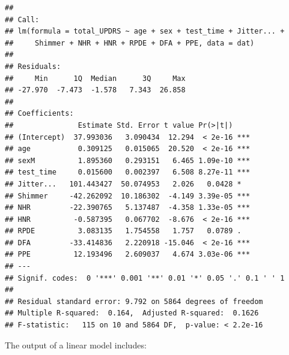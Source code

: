 \documentclass[
]{article}
\begin{document}
\begin{verbatim}
## 
## Call:
## lm(formula = total_UPDRS ~ age + sex + test_time + Jitter... + 
##     Shimmer + NHR + HNR + RPDE + DFA + PPE, data = dat)
## 
## Residuals:
##     Min      1Q  Median      3Q     Max 
## -27.970  -7.473  -1.578   7.343  26.858 
## 
## Coefficients:
##               Estimate Std. Error t value Pr(>|t|)    
## (Intercept)  37.993036   3.090434  12.294  < 2e-16 ***
## age           0.309125   0.015065  20.520  < 2e-16 ***
## sexM          1.895360   0.293151   6.465 1.09e-10 ***
## test_time     0.015600   0.002397   6.508 8.27e-11 ***
## Jitter...   101.443427  50.074953   2.026   0.0428 *  
## Shimmer     -42.262092  10.186302  -4.149 3.39e-05 ***
## NHR         -22.390765   5.137487  -4.358 1.33e-05 ***
## HNR          -0.587395   0.067702  -8.676  < 2e-16 ***
## RPDE          3.083135   1.754558   1.757   0.0789 .  
## DFA         -33.414836   2.220918 -15.046  < 2e-16 ***
## PPE          12.193496   2.609037   4.674 3.03e-06 ***
## ---
## Signif. codes:  0 '***' 0.001 '**' 0.01 '*' 0.05 '.' 0.1 ' ' 1
## 
## Residual standard error: 9.792 on 5864 degrees of freedom
## Multiple R-squared:  0.164,  Adjusted R-squared:  0.1626 
## F-statistic:   115 on 10 and 5864 DF,  p-value: < 2.2e-16
\end{verbatim}

The output of a linear model includes:
\end{document}
